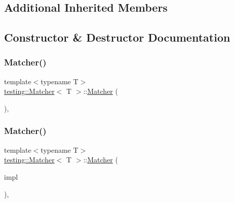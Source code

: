 \subsection*{Additional Inherited Members}


\subsection{Constructor \& Destructor Documentation}
\mbox{\label{classtesting_1_1_matcher_a57bfc9e62d7f6acfee5ad88d1077931c}} 
\subsubsection{\texorpdfstring{Matcher()}{Matcher()}\hspace{0.1cm}{\footnotesize\ttfamily [1/3]}}
{\footnotesize\ttfamily template$<$typename T$>$ \\
\hyperlink{classtesting_1_1_matcher}{testing\+::\+Matcher}$<$ T $>$\+::\hyperlink{classtesting_1_1_matcher}{Matcher} (\begin{DoxyParamCaption}{ }\end{DoxyParamCaption})\hspace{0.3cm}{\ttfamily [inline]}, {\ttfamily [explicit]}}

\mbox{\label{classtesting_1_1_matcher_aea32eb3f86233853de91929fb2691bf3}} 
\subsubsection{\texorpdfstring{Matcher()}{Matcher()}\hspace{0.1cm}{\footnotesize\ttfamily [2/3]}}
{\footnotesize\ttfamily template$<$typename T$>$ \\
\hyperlink{classtesting_1_1_matcher}{testing\+::\+Matcher}$<$ T $>$\+::\hyperlink{classtesting_1_1_matcher}{Matcher} (\begin{DoxyParamCaption}\item[{const \hyperlink{classtesting_1_1_matcher_interface}{Matcher\+Interface}$<$ T $>$ $\ast$}]{impl }\end{DoxyParamCaption})\hspace{0.3cm}{\ttfamily [inline]}, {\ttfamily [explicit]}}

